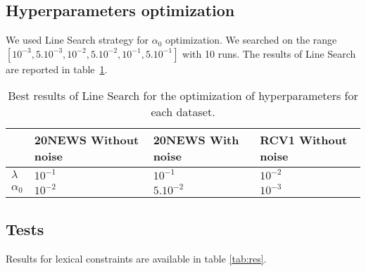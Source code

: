\documentclass[a4paper]{article}
\begin{document}
\subsection{Hyperparameters optimization}
We used Line Search strategy for 
$\alpha_0$ optimization. We searched on the range  $[10^{-3},5.10^{-3},10^{-2},
5.10^{-2},10^{-1},5.10^{-1}]$ with 10 runs.   
The results of Line Search are reported in table~\ref{tab2}.
\begin{table}[!h]
  \centering
    \begin{tabular}{| l | l | l | l |}
      \hline
      & 20NEWS Without noise & 20NEWS With noise & RCV1 Without noise  \\ \hline
      $\lambda$  & $10^{-1}$ & $10^{-1}$         & $10^{-2}$           \\ \hline
      $\alpha_0$ & $10^{-2}$ & $5.10^{-2}$       & $10^{-3}$           \\ \hline
    \end{tabular}
    \caption{\label{tab2}Best results of Line Search for the optimization of
      hyperparameters for each dataset.}
\end{table}

\subsection{Tests}
Results for lexical constraints are available in table \ref{tab:res}.  
\begin{table}[h]
  \caption{\label{tab:res}Clustering with only lexical constraints applies to 
different learned latent space to measure the efficiency of lexical constraints
for $K$-Means algorithm. Performance is measured in terms of NMI, Adjusted Rand 
Index and clustering Accuracy, higher is better. Each cell contains the average
and the standard deviation computed over 10 runs. The best result for each 
metric/dataset is underlined. In a first time, only lexical constraints have 
been tested.}
\end{table}
\newpage
\end{document}
